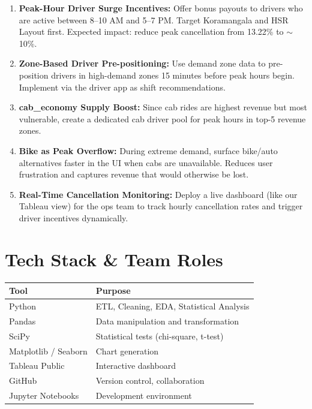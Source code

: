 \documentclass[12pt,a4paper]{article}
\begin{document}
\begin{enumerate}
  \item \textbf{Peak-Hour Driver Surge Incentives:} Offer bonus payouts to drivers who are active between 8--10 AM and 5--7 PM. Target Koramangala and HSR Layout first. Expected impact: reduce peak cancellation from 13.22\% to $\sim$10\%.

  \item \textbf{Zone-Based Driver Pre-positioning:} Use demand zone data to pre-position drivers in high-demand zones 15 minutes before peak hours begin. Implement via the driver app as shift recommendations.

  \item \textbf{cab\_economy Supply Boost:} Since cab rides are highest revenue but most vulnerable, create a dedicated cab driver pool for peak hours in top-5 revenue zones.

  \item \textbf{Bike as Peak Overflow:} During extreme demand, surface bike/auto alternatives faster in the UI when cabs are unavailable. Reduces user frustration and captures revenue that would otherwise be lost.

  \item \textbf{Real-Time Cancellation Monitoring:} Deploy a live dashboard (like our Tableau view) for the ops team to track hourly cancellation rates and trigger driver incentives dynamically.
\end{enumerate}

\section{Tech Stack \& Team Roles}

\begin{center}
\begin{tabular}{ll}
\toprule
\textbf{Tool} & \textbf{Purpose} \\
\midrule
Python & ETL, Cleaning, EDA, Statistical Analysis \\
Pandas & Data manipulation and transformation \\
SciPy & Statistical tests (chi-square, t-test) \\
Matplotlib / Seaborn & Chart generation \\
Tableau Public & Interactive dashboard \\
GitHub & Version control, collaboration \\
Jupyter Notebooks & Development environment \\
\bottomrule
\end{tabular}
\end{center}
\end{document}
